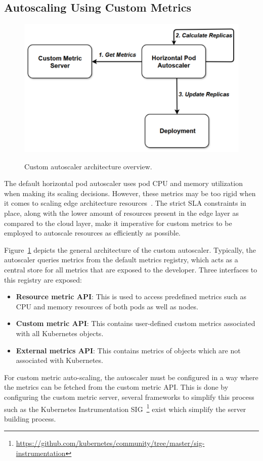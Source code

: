 \subsection{Autoscaling Using Custom Metrics}
\label{subsec:ch2-custom-auto-scaling}

\begin{figure}[htb]
    \centering
    \caption{Custom autoscaler architecture overview.}
    \includegraphics[width=.7\linewidth]{Figures/Custom-Metrics-Autoscaling.pdf}
    \label{fig:custom-autoscale-overview}
\end{figure}

The default horizontal pod autoscaler uses pod CPU and memory utilization when making its scaling decisions. However, these metrics may be too rigid when it comes to scaling edge architecture resources~\cite{coulson2020adaptive}. The strict SLA constraints in place, along with the lower amount of resources present in the edge layer as compared to the cloud layer, make it imperative for custom metrics to be employed to autoscale resources as efficiently as possible.\par

Figure~\ref{fig:custom-autoscale-overview} depicts the general architecture of the custom autoscaler. Typically, the autoscaler queries metrics from the default metrics registry, which acts as a central store for all metrics that are exposed to the developer. Three interfaces to this registry are exposed:
\begin{itemize}
    \item \textbf{Resource metric API}: This is used to access predefined metrics such as CPU and memory resources of both pods as well as nodes.
    \item \textbf{Custom metric API}: This contains user-defined custom metrics associated with all Kubernetes objects.
    \item \textbf{External metrics API}: This contains metrics of objects which are not associated with Kubernetes.
\end{itemize}
For custom metric auto-scaling, the autoscaler must be configured in a way where the metrics can be fetched from the custom metric API. This is done by configuring the custom metric server, several frameworks to simplify this process such as the Kubernetes Instrumentation SIG~\footnote{\url{https://github.com/kubernetes/community/tree/master/sig-instrumentation}} exist which simplify the server building process.

